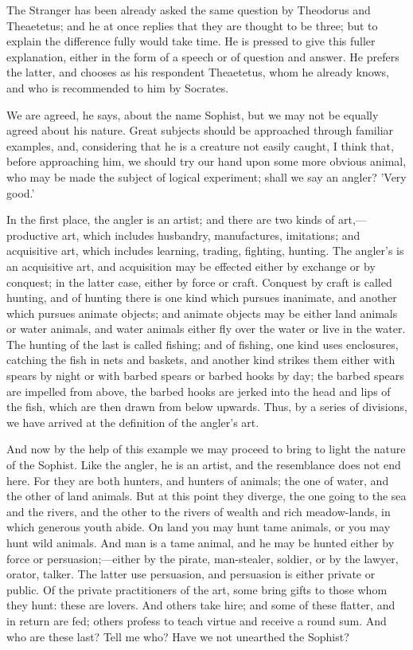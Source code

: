 \documentclass[11pt,letter]{article}
\begin{document}
\par  The Stranger has been already asked the same question by Theodorus and Theaetetus; and he at once replies that they are thought to be three; but to explain the difference fully would take time. He is pressed to give this fuller explanation, either in the form of a speech or of question and answer. He prefers the latter, and chooses as his respondent Theaetetus, whom he already knows, and who is recommended to him by Socrates.

\par  We are agreed, he says, about the name Sophist, but we may not be equally agreed about his nature. Great subjects should be approached through familiar examples, and, considering that he is a creature not easily caught, I think that, before approaching him, we should try our hand upon some more obvious animal, who may be made the subject of logical experiment; shall we say an angler? 'Very good.'

\par  In the first place, the angler is an artist; and there are two kinds of art,—productive art, which includes husbandry, manufactures, imitations; and acquisitive art, which includes learning, trading, fighting, hunting. The angler's is an acquisitive art, and acquisition may be effected either by exchange or by conquest; in the latter case, either by force or craft. Conquest by craft is called hunting, and of hunting there is one kind which pursues inanimate, and another which pursues animate objects; and animate objects may be either land animals or water animals, and water animals either fly over the water or live in the water. The hunting of the last is called fishing; and of fishing, one kind uses enclosures, catching the fish in nets and baskets, and another kind strikes them either with spears by night or with barbed spears or barbed hooks by day; the barbed spears are impelled from above, the barbed hooks are jerked into the head and lips of the fish, which are then drawn from below upwards. Thus, by a series of divisions, we have arrived at the definition of the angler's art.

\par  And now by the help of this example we may proceed to bring to light the nature of the Sophist. Like the angler, he is an artist, and the resemblance does not end here. For they are both hunters, and hunters of animals; the one of water, and the other of land animals. But at this point they diverge, the one going to the sea and the rivers, and the other to the rivers of wealth and rich meadow-lands, in which generous youth abide. On land you may hunt tame animals, or you may hunt wild animals. And man is a tame animal, and he may be hunted either by force or persuasion;—either by the pirate, man-stealer, soldier, or by the lawyer, orator, talker. The latter use persuasion, and persuasion is either private or public. Of the private practitioners of the art, some bring gifts to those whom they hunt: these are lovers. And others take hire; and some of these flatter, and in return are fed; others profess to teach virtue and receive a round sum. And who are these last? Tell me who? Have we not unearthed the Sophist?
\end{document}
